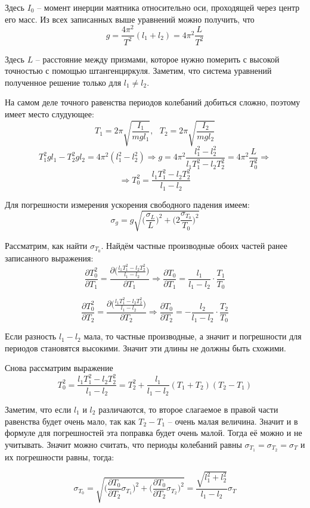 \documentclass[a4paper, 12pt]{article} %
\begin{document}
Здесь $I_0$ -- момент инерции маятника относительно оси, проходящей через центр его масс. Из всех записанных выше уравнений можно получить, что
\[g = \frac{4\pi^2}{T^2}(l_1+l_2) = 4\pi^2\frac{L}{T^2}\]

Здесь $L$ -- расстояние между призмами, которое нужно померить с высокой точностью с помощью штангенциркуля. Заметим, что система уравнений полученное решение только для $l_1 \neq l_2$. 

На самом деле точного равенства периодов колебаний добиться сложно, поэтому имеет место слудующее:
\[T_1 = 2\pi \sqrt{\frac{I_1}{mgl_1}},\text{ }  T_2 = 2\pi \sqrt{\frac{I_2}{mgl_2}}\]
\[T_1^2gl_1 - T^2_2gl_2 = 4\pi^2(l_1^2 - l_2^2) \Rightarrow g = 4\pi^2 \frac{l_1^2 - l_2^2}{l_1 T_1^2 - l_2 T_2^2} = 4\pi^2\frac{L}{T_0^2} \Rightarrow\]
\[\Rightarrow T_0^2 = \frac{l_1 T_1^2 - l_2 T_2^2}{l_1 - l_2}\]

Для погрешности измерения ускорения свободного падения имеем:
\[\sigma_g = g \sqrt{\Big( \frac{\sigma_L}{L} \Big)^2 + \Big(2 \frac{\sigma_{T_0}}{T_0} \Big)^2}\]

Рассматрим, как найти $\sigma_{T_0}$. Найдём частные производные обоих частей ранее записанного выражения:
\[\frac{\partial T_0^2}{\partial T_1} = \frac{\partial \Big(\frac{l_1 T_1^2 - l_2 T_2^2}{l_1 - l_2} \Big)}{\partial T_1} \Rightarrow \frac{\partial T_0}{\partial T_1} = \frac{l_1}{l_1-l_2} \cdot \frac{T_1}{T_0}\]

\[\frac{\partial T_0^2}{\partial T_2} = \frac{\partial \Big(\frac{l_1 T_1^2 - l_2 T_2^2}{l_1 - l_2} \Big)}{\partial T_2} \Rightarrow \frac{\partial T_0}{\partial T_2} = -\frac{l_2}{l_1-l_2} \cdot \frac{T_2}{T_0}\]

Если разность $l_1-l_2$ мала, то частные производные, а значит и погрешности для периодов становятся высокими. Значит эти длины не должны быть схожими. 

Снова рассматрим выражение
\[T_0^2 = \frac{l_1 T_1^2 - l_2 T_2^2}{l_1 - l_2} = T^2_2 + \frac{l_1}{l_1-l_2}(T_1 + T_2)(T_2 - T_1)\]

Заметим, что если $l_1$ и $l_2$ различаются, то второе слагаемое в правой части равенства будет очень мало, так как $T_2 - T_1$ -- очень малая величина. Значит и в формуле для погрешностей эта поправка будет очень малой. Тогда её можно и не учитывать. Значит можно считать, что периоды колебаний равны $\sigma_{T_1} = \sigma_{T_2} = \sigma_{T}$ и их погрешности равны, тогда:

\[\sigma_{T_0} = \sqrt{\Big( \frac{\partial T_0}{\partial T_2} \sigma_{T_1} \Big)^2 + \Big( \frac{\partial T_0}{\partial T_2} \sigma_{T_2} \Big)^2} = \frac{\sqrt{l_1^2 + l_2^2}}{l_1 - l_2}\sigma_T\]
 
\end{document}
